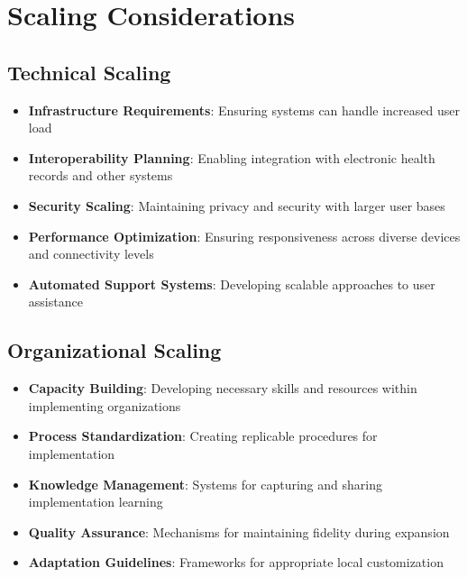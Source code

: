 \section{Scaling Considerations}
\subsection{Technical Scaling}
\begin{itemize}
    \item \textbf{Infrastructure Requirements}: Ensuring systems can handle increased user load
    
    \item \textbf{Interoperability Planning}: Enabling integration with electronic health records and other systems
    
    \item \textbf{Security Scaling}: Maintaining privacy and security with larger user bases
    
    \item \textbf{Performance Optimization}: Ensuring responsiveness across diverse devices and connectivity levels
    
    \item \textbf{Automated Support Systems}: Developing scalable approaches to user assistance
\end{itemize}

\subsection{Organizational Scaling}
\begin{itemize}
    \item \textbf{Capacity Building}: Developing necessary skills and resources within implementing organizations
    
    \item \textbf{Process Standardization}: Creating replicable procedures for implementation
    
    \item \textbf{Knowledge Management}: Systems for capturing and sharing implementation learning
    
    \item \textbf{Quality Assurance}: Mechanisms for maintaining fidelity during expansion
    
    \item \textbf{Adaptation Guidelines}: Frameworks for appropriate local customization
\end{itemize}

